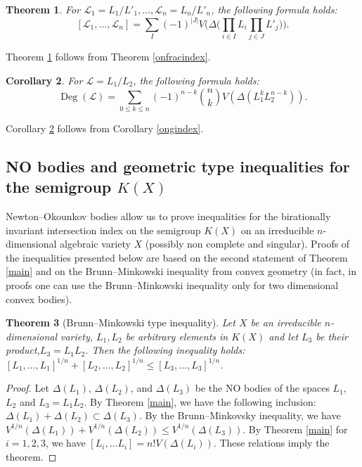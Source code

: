 \documentclass[11pt]{article}
\theoremstyle{plain}
\newtheorem{theorem}{Theorem}[section]
\newtheorem{corollary}[theorem]{Corollary}
\theoremstyle{definition}
\newcommand\D{\operatorname{Deg}}
\begin{document}
\begin{theorem}\label{virtualNO} For $\mathcal L_1=L_1/L'_1,\dots, \mathcal L_n= L_n/L'_n$, the following formula holds:
\begin{equation}\label{fvirtualNO}
[\mathcal L_1,\dots, \mathcal L_n] = \sum_{I} (-1)^{|J|}V\Bigg(\Delta\Bigg(\prod_{i\in I } L_i \prod _{j\in J} L'_j\Bigg)\Bigg).
\end{equation}
\end{theorem}

Theorem \ref{virtualNO} follows from Theorem \ref{onfracindex}.


\begin{corollary}\label{selfNo} For $\mathcal L=L_1/L_2$, the following formula holds:
\begin{equation}\label{fselfNO}
\D(\mathcal L) = \sum_{0\leq k\leq n} (-1)^{n-k}{n\choose k} V(\Delta (L_1^k L_2^{n-k})).
\end{equation}
\end{corollary}

Corollary \ref{selfNo}  follows from Corollary \ref{ongindex}.

\subsection{NO bodies and geometric type inequalities for the semigroup $K(X)$}

Newton--Okounkov bodies allow us to prove inequalities for the birationally invariant intersection index on the semigroup $K(X)$ on an irreducible $n$-dimensional algebraic variety $X$ (possibly non complete and singular). Proofs of the inequalities presented below  are based on the second statement of Theorem \ref{main} and on the Brunn--Minkowski inequality from convex geometry (in fact, in proofs one can use the Brunn--Minkowski inequality only for two dimensional convex bodies).


\begin{theorem}[Brunn--Minkowski type inequality]\label{aBM} Let $X$ be an irreducible $n$-dimensional  variety,  $L_1, L_2 $ be arbitrary elements in $ K(X)$ and let $L_3$ be their product,$L_3 = L_1L_2$.  Then the following inequality holds:
 $[L_1,\dots, L_1]^{1/n} + [L_2,\dots, L_2]^{1/n} \leq  [L_3,\dots, L_3]^{1/n}$.
 \end{theorem}

\begin{proof} Let $\Delta(L_1)$, $\Delta(L_2)$, and $\Delta(L_3)$ be the NO bodies of the spaces $L_1$, $L_2$ and $L_3=L_1L_2$.  By Theorem \ref{main}, we have the following inclusion: $\Delta (L_1)+\Delta(L_2) \subset \Delta (L_3)$. By  the Brunn--Minkovsky inequality, we have $V^{1/n} ( \Delta(L_1)) +  V^{1/n} (\Delta(L_2))\leq V^{1/n} (\Delta(L_3))$. By Theorem \ref{main} for $i=1,2,3$, we have $[L_i,\dots L_i]=n!V( \Delta (L_i))$. These relations imply the theorem.
\end{proof}
\end{document}
